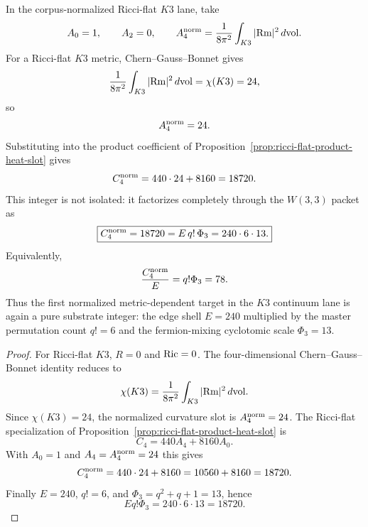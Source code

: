 
\makeatletter
{}
\makeatother
\providecommand{\PSp}{\mathrm{PSp}}
\providecommand{\Aut}{\mathrm{Aut}}
\providecommand{\spec}{\operatorname{spec}}


\begin{proposition}
\label{prop:k3-a4-normalized-closure}
In the corpus-normalized Ricci-flat $K3$ lane, take
\[
  A_0=1,\qquad A_2=0,\qquad
  A_4^{\rm norm}=\frac{1}{8\pi^2}\int_{K3}|{\rm Rm}|^2\,d{\rm vol}.
\]
For a Ricci-flat $K3$ metric, Chern--Gauss--Bonnet gives
\[
  \frac{1}{8\pi^2}\int_{K3}|{\rm Rm}|^2\,d{\rm vol}=\chi(K3)=24,
\]
so
\[
  A_4^{\rm norm}=24.
\]
Substituting into the product coefficient of
Proposition~\ref{prop:ricci-flat-product-heat-slot} gives
\[
  C_4^{\rm norm}=440\cdot24+8160=18720.
\]
This integer is not isolated: it factorizes completely through the $W(3,3)$
packet as
\[
  \boxed{
  C_4^{\rm norm}=18720=E\,q!\,\Phi_3=240\cdot6\cdot13.
  }
\]
Equivalently,
\[
  \frac{C_4^{\rm norm}}{E}=q!\Phi_3=78.
\]
Thus the first normalized metric-dependent target in the $K3$ continuum lane is
again a pure substrate integer: the edge shell $E=240$ multiplied by the master
permutation count $q!=6$ and the fermion-mixing cyclotomic scale
$\Phi_3=13$.
\end{proposition}

\begin{proof}
For Ricci-flat $K3$, $R=0$ and ${\rm Ric}=0$.  The four-dimensional
Chern--Gauss--Bonnet identity reduces to
\[
  \chi(K3)=\frac{1}{8\pi^2}\int_{K3}|{\rm Rm}|^2\,d{\rm vol}.
\]
Since $\chi(K3)=24$, the normalized curvature slot is $A_4^{\rm norm}=24$.
The Ricci-flat specialization of Proposition~\ref{prop:ricci-flat-product-heat-slot}
is
\[
  C_4=440A_4+8160A_0.
\]
With $A_0=1$ and $A_4=A_4^{\rm norm}=24$ this gives
\[
  C_4^{\rm norm}=440\cdot24+8160=10560+8160=18720.
\]
Finally $E=240$, $q!=6$, and $\Phi_3=q^2+q+1=13$, hence
\[
  E q!\Phi_3=240\cdot6\cdot13=18720.
\]
\end{proof}
